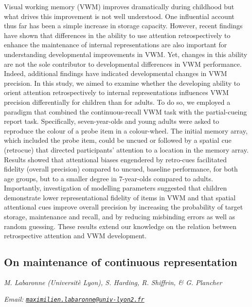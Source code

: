 \documentclass[
  12pt,
]{book}
\begin{document}
Visual working memory (VWM) improves dramatically during childhood but what drives this improvement is not well understood. One influential account thus far has been a simple increase in storage capacity. However, recent findings have shown that differences in the ability to use attention retrospectively to enhance the maintenance of internal representations are also important for understanding developmental improvements in VWM. Yet, changes in this ability are not the sole contributor to developmental differences in VWM performance. Indeed, additional findings have indicated developmental changes in VWM precision. In this study, we aimed to examine whether the developing ability to orient attention retrospectively to internal representations influences VWM precision differentially for children than for adults. To do so, we employed a paradigm that combined the continuous-recall VWM task with the partial-cueing report task. Specifically, seven-year-olds and young adults were asked to reproduce the colour of a probe item in a colour-wheel. The initial memory array, which included the probe item, could be uncued or followed by a spatial cue (retrocue) that directed participants' attention to a location in the memory array. Results showed that attentional biases engendered by retro-cues facilitated fidelity (overall precision) compared to uncued, baseline performance, for both age groups, but to a smaller degree in 7-year-olds compared to adults. Importantly, investigation of modelling parameters suggested that children demonstrate lower representational fidelity of items in VWM and that spatial attentional cues improve overall precision by increasing the probability of target storage, maintenance and recall, and by reducing misbinding errors as well as random guessing. These results extend our knowledge on the relation between retrospective attention and VWM development.

\hypertarget{on-maintenance-of-continuous-representation}{%
\subsection{On maintenance of continuous representation}\label{on-maintenance-of-continuous-representation}}

\emph{M. Labaronne (Universitè Lyon), S. Harding, R. Shiffrin, \& G. Plancher}

\emph{Email: \href{mailto:maximilien.labaronne@univ-lyon2.fr}{\nolinkurl{maximilien.labaronne@univ-lyon2.fr}}}
\end{document}
